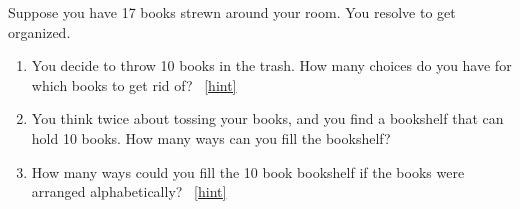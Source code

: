 \documentclass{book}
\begin{document}
\setcounter{project}{91}
\addtocounter{project}{-1}
\begin{activity}[]\label{activity-84}
\hypertarget{p-698}{}%
Suppose you have 17 books strewn around your room.  You resolve to get organized.%
\begin{enumerate}[font=\bfseries,label=(\alph*),ref=\alph*]
\item\label{task-136} \hypertarget{p-699}{}%
You decide to throw 10 books in the trash.  How many choices do you have for which books to get rid of?%
~\hfill{\tiny\hyperlink{a-91.a}{[hint]}\hypertarget{q-91.a}{}}\item\label{task-137} \hypertarget{p-701}{}%
You think twice about tossing your books, and you find a bookshelf that can hold 10 books.  How many ways can you fill the bookshelf?%
\item\label{task-138} \hypertarget{p-702}{}%
How many ways could you fill the 10 book bookshelf if the books were arranged alphabetically?%
~\hfill{\tiny\hyperlink{a-91.c}{[hint]}\hypertarget{q-91.c}{}}\end{enumerate}
\end{activity}
\end{document}
